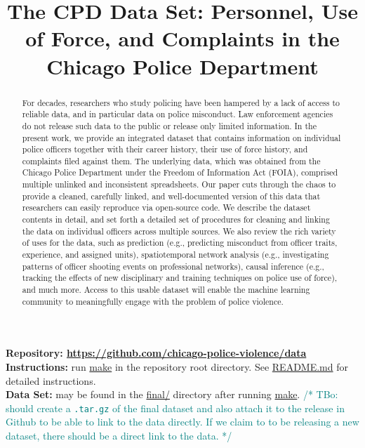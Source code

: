 \documentclass{article}
\title{The CPD Data Set: Personnel, Use of Force, and Complaints in the Chicago Police Department}
\newcommand{\tbo}[1]{\textcolor{teal}{/* TBo: #1 */}}
\begin{document}
\maketitle

\begin{abstract}
For decades, researchers who study policing have been hampered by a lack of
access to reliable data, and in particular data on police misconduct. Law
enforcement agencies do not release such data to the public or release only
limited information. In the present work, we provide an integrated dataset that
contains information on individual police officers together with their career
history, their use of force history, and complaints filed against them. The
underlying data, which was obtained from the Chicago Police Department under
the Freedom of Information Act (FOIA), comprised multiple unlinked and
inconsistent spreadsheets. Our paper cuts through the chaos to provide
a cleaned, carefully linked, and well-documented version of this data that
researchers can easily reproduce via open-source code. We describe the dataset
contents in detail, and set forth a detailed set of procedures for cleaning and
linking the data on individual officers across multiple sources. We also review
the rich variety of uses for the data, such as prediction (e.g., predicting
misconduct from officer traits, experience, and assigned units), spatiotemporal
network analysis (e.g., investigating patterns of officer shooting events on
professional networks), causal inference (e.g., tracking the effects of new
disciplinary and training techniques on police use of force), and much more.
Access to this usable dataset will enable the machine learning community to
meaningfully engage with the problem of police violence.
\end{abstract}

\textbf{Repository: \url{https://github.com/chicago-police-violence/data}}\\
\textbf{Instructions:} run \url{make} in the repository root directory. See \url{README.md} for detailed instructions.\\
\textbf{Data Set:} may be found in the \url{final/} directory after running \url{make}.
\tbo{should create a \texttt{.tar.gz} of the final dataset and also attach it
to the release in Github to be able to link to the data directly. If we claim
to to be releasing a new dataset, there should be a direct link to the data.}















\appendix






\end{document}
